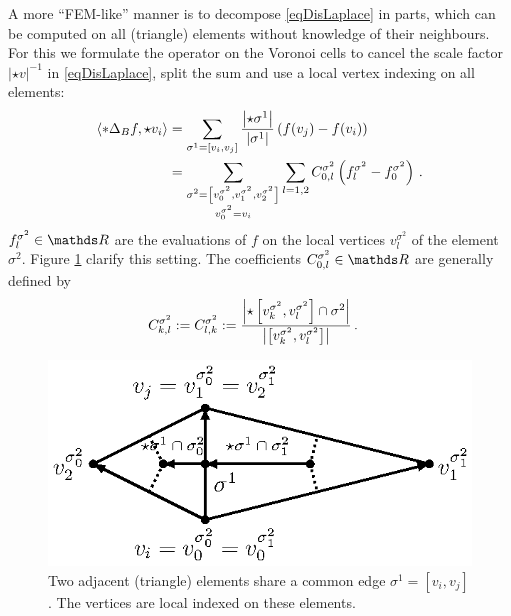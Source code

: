         A more ``FEM-like'' manner is to decompose \eqref{eqDisLaplace} in parts, which can be computed on all (triangle) elements without
        knowledge of their neighbours.
        For this we formulate the operator on the Voronoi cells to cancel the scale factor \( \left| \star v \right|^{-1} \) 
        in \eqref{eqDisLaplace}, split the sum and use a local vertex indexing on all elements:
        \begin{align} \label{eqVoronoiLaplace}
                \left\langle *\Delta_{B} f , \star v_{i} \right\rangle
                               &= \sum_{\sigma^{1}=\left[ v_{i}, v_{j} \right]} 
                     \frac{\left| \star\sigma^{1} \right|}{\left| \sigma^{1} \right|}
                      \left( f(v_{j}) - f(v_{i}) \right)\\
                               &= \sum_{\substack{\sigma^{2}=\left[ v^{\sigma^{2}}_{0},v^{\sigma^{2}}_{1},v^{\sigma^{2}}_{2} \right]
                              \\
                                               v^{\sigma^{2}}_{0} = v_{i}}}
                  \sum_{l=1,2} C^{\sigma^{2}}_{0,l} 
                          \left( f^{\sigma^{2}}_{l} -  f^{\sigma^{2}}_{0}\right) \,\text{.} \label{eqLokalLaplace}
        \end{align}
        \( f^{\sigma^{2}}_{l}\in\R \) are the evaluations of \( f \) on the local vertices \( v^{\sigma^{2}}_{l} \) of the element \(
        \sigma^{2}\).
        Figure \ref{figLocalIndexing} clarify this setting.
        The coefficients \( C^{\sigma^{2}}_{0,l}\in\R \) are generally defined by
        \begin{align}
               C^{\sigma^{2}}_{k,l} &:= C^{\sigma^{2}}_{l,k}
                            := \frac{\left| \star \left[ v^{\sigma^{2}}_{k}, v^{\sigma^{2}}_{l} \right] 
                                            \cap \sigma^{2}\right|}
                                   {\left| \left[ v^{\sigma^{2}}_{k}, v^{\sigma^{2}}_{l} \right] \right|}\,\text{.}
        \end{align}
        \begin{figure}
          \centering
          \includegraphics[width=.45\textwidth]{bilder/tikz/elementSummeKante.eps}
          \caption{Two adjacent (triangle) elements share a common edge \( \sigma^{1}=\left[ v_{i}, v_{j} \right] \).
                   The vertices are local indexed on these elements.}
          \label{figLocalIndexing}
        \end{figure}
